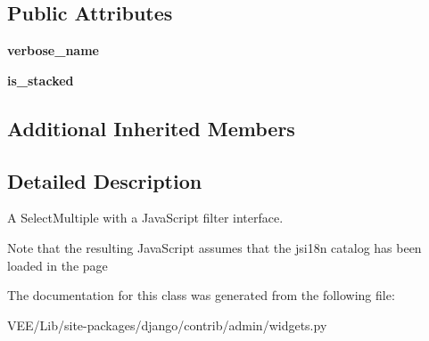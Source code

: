 \subsection*{Public Attributes}
\begin{DoxyCompactItemize}
\item 
\mbox{\label{classdjango_1_1contrib_1_1admin_1_1widgets_1_1_filtered_select_multiple_a5a8057e6e509f34c1df346641eb5f71f}} 
{\bfseries verbose\+\_\+name}
\item 
\mbox{\label{classdjango_1_1contrib_1_1admin_1_1widgets_1_1_filtered_select_multiple_a11d0b8dc7a677e367e0dfa37d187e36b}} 
{\bfseries is\+\_\+stacked}
\end{DoxyCompactItemize}
\subsection*{Additional Inherited Members}


\subsection{Detailed Description}
\begin{DoxyVerb}A SelectMultiple with a JavaScript filter interface.

Note that the resulting JavaScript assumes that the jsi18n
catalog has been loaded in the page
\end{DoxyVerb}
 

The documentation for this class was generated from the following file\+:\begin{DoxyCompactItemize}
\item 
V\+E\+E/\+Lib/site-\/packages/django/contrib/admin/widgets.\+py\end{DoxyCompactItemize}

